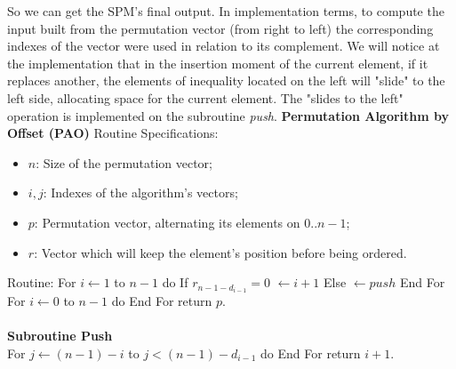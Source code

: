 \documentclass {amsart}
\begin{document}
So we can get the SPM's final output. In implementation terms, to
compute the input built from the permutation vector (from right to
left) the corresponding indexes of the vector were used in
relation to its complement. We will notice at the implementation
that in the insertion moment of the current element, if it
replaces another, the elements of inequality located on the left
will "slide" to the left side, allocating space for the current
element. The "slides to the left" operation is implemented on the
subroutine \emph{push}.
\newline \newline
\textbf{Permutation Algorithm by Offset (PAO)}
\newline
Routine Specifications:
\begin{itemize}
    \item {$n$}: Size of the permutation vector;
    \item {$i,j$}: Indexes of the algorithm's vectors;
    \item {$p$}: Permutation vector, alternating its elements on {$0..n-1$};
    \item {$r$}: Vector which will keep the element's position before being ordered.
\end{itemize}
Routine:
\newline
{}
\newline
 \indent For {$i \leftarrow 1$} to {$n-1$} do \newline
  \indent \indent If {$r_{n-1-d_{i-1}} = 0$} \newline
   \indent \indent {} {$\leftarrow i+1$} \newline
  \indent \indent Else \newline
   \indent \indent {} {$\leftarrow push$} \newline
\indent End For \newline \indent For {$i \leftarrow 0$} to {$n-1$}
do \newline
   \indent {} \newline
\indent  End For \newline return {$p$}.
\\\\
\textbf{Subroutine Push} \\
\indent For {$j \leftarrow (n-1) - i$}
to {$j < (n - 1) - d_{i-1}$} do
\newline
\indent {}
\newline
\indent End For
\newline
return {$i+1$}.
\end{document}
